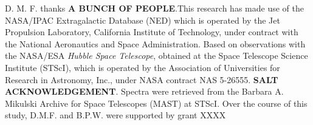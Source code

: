 \documentclass[twocolumn,tighten]{aastex62}
\begin{document}
\acknowledgements

D. M. F. thanks \textbf{A BUNCH OF PEOPLE}.This research has made use of the NASA/IPAC Extragalactic Database (NED) which is operated by the Jet Propulsion Laboratory, California Institute of Technology, under contract with the National Aeronautics and Space Administration. Based on observations with the NASA/ESA \textit{Hubble Space Telescope}, obtained at the Space Telescope Science Institute (STScI), which is operated by the Association of Universities for Research in Astronomy, Inc., under NASA contract NAS 5-26555. \textbf{SALT ACKNOWLEDGEMENT}. Spectra were retrieved from the Barbara A. Mikulski Archive for Space Telescopes (MAST) at STScI. Over the course of this study, D.M.F. and B.P.W. were supported by grant XXXX


\clearpage

%
{}


\clearpage

\appendix
\end{document}
